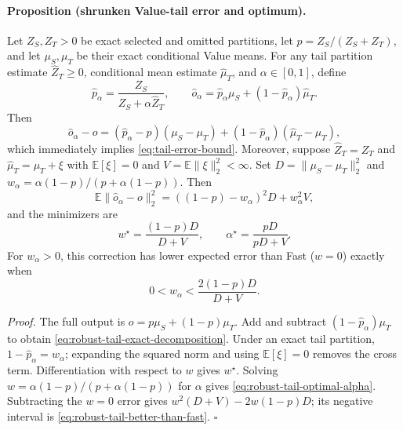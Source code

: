 \paragraph{Proposition (shrunken Value-tail error and optimum).}
Let $Z_S,Z_T>0$ be exact selected and omitted partitions, let
$p=Z_S/(Z_S+Z_T)$, and let $\mu_S,\mu_T$ be their exact conditional Value
means.  For any tail partition estimate $\widehat Z_T\ge0$, conditional mean
estimate $\widehat\mu_T$, and $\alpha\in[0,1]$, define
\begin{equation}
 \widehat p_\alpha=
 \frac{Z_S}{Z_S+\alpha\widehat Z_T},\qquad
 \widehat o_\alpha=
 \widehat p_\alpha\mu_S+(1-\widehat p_\alpha)\widehat\mu_T.
\end{equation}
Then
\begin{equation}
 \widehat o_\alpha-o
 = (\widehat p_\alpha-p)(\mu_S-\mu_T)
 +(1-\widehat p_\alpha)(\widehat\mu_T-\mu_T),
 \label{eq:robust-tail-exact-decomposition}
\end{equation}
which immediately implies \cref{eq:tail-error-bound}.  Moreover, suppose
$\widehat Z_T=Z_T$ and
$\widehat\mu_T=\mu_T+\xi$ with $\mathbb E[\xi]=0$ and
$V=\mathbb E\|\xi\|_2^2<\infty$.  Set
$D=\|\mu_S-\mu_T\|_2^2$ and
$w_\alpha=\alpha(1-p)/(p+\alpha(1-p))$.  Then
\begin{equation}
 \mathbb E\|\widehat o_\alpha-o\|_2^2
 =((1-p)-w_\alpha)^2D+w_\alpha^2V,
\end{equation}
and the minimizers are
\begin{equation}
 w^\star=\frac{(1-p)D}{D+V},\qquad
 \alpha^\star=\frac{pD}{pD+V}.
 \label{eq:robust-tail-optimal-alpha}
\end{equation}
For $w_\alpha>0$, this correction has lower expected error than Fast
($w=0$) exactly when
\begin{equation}
 0<w_\alpha<\frac{2(1-p)D}{D+V}.
 \label{eq:robust-tail-better-than-fast}
\end{equation}

\emph{Proof.}
The full output is $o=p\mu_S+(1-p)\mu_T$.  Add and subtract
$(1-\widehat p_\alpha)\mu_T$ to obtain
\cref{eq:robust-tail-exact-decomposition}.  Under an exact tail partition,
$1-\widehat p_\alpha=w_\alpha$; expanding the squared norm and using
$\mathbb E[\xi]=0$ removes the cross term.  Differentiation with respect to
$w$ gives $w^\star$.  Solving
$w=\alpha(1-p)/(p+\alpha(1-p))$ for $\alpha$ gives
\cref{eq:robust-tail-optimal-alpha}.  Subtracting the $w=0$ error gives
$w^2(D+V)-2w(1-p)D$; its negative interval is
\cref{eq:robust-tail-better-than-fast}.  \hfill$\square$

